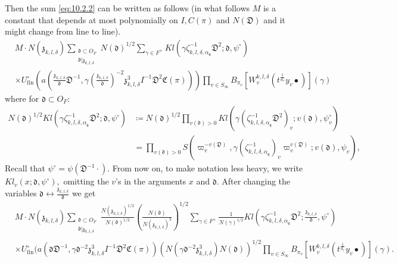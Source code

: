\documentclass[a4paper,11pt]{amsart}
\theoremstyle{definition}
\newcommand{\fin}{\text{fin}}
\begin{document}
   Then the sum \eqref{eq:10.2.2} can be written as follows (in what follows $M$ is a constant that depends at most polynomially on $I,C(\pi)$ and $N(\mathfrak{D})$ and it might change from line to line). 
    \begin{align*}
        &M\cdot N(\mathfrak{z}_{k,l,\delta})\sum_{\substack{\mathfrak{d}\subset O_F\\\mathfrak{d}|\mathfrak{z}_{k,l,\delta}}}N(\mathfrak{d})^{1/2}\sum_{\gamma \in F^{\times}}Kl(\gamma\zeta_{k,l,\delta,\alpha_{\mathfrak{q}}}^{-1}\mathfrak{D}^2;\mathfrak{d},\psi^{\circ})\\
    &\times U_{\fin}^{\circ}\left(a\left(\frac{\mathfrak{z}_{k,l,\delta}}{\mathfrak{d}}\mathfrak{D}^{-1},\gamma (\frac{\mathfrak{z}_{k,l,\delta}}{\mathfrak{d}})^{-2}\mathfrak{z}_{k,l,\delta}^3I^{-1}\mathfrak{D}^2\mathfrak{C}(\pi)\right)\right)\prod_{v\in S_{\infty}}B_{\pi_v}[W_v^{k,l,\delta}(t^{\frac{1}{d_v}}y_v\bullet)](\gamma)
\end{align*}
where for $\mathfrak{d}\subset O_F$: \begin{align*}N(\mathfrak{d})^{1/2}Kl(\gamma\zeta_{k,l,\delta,\alpha_{\mathfrak{q}}}^{-1}\mathfrak{D}^2;\mathfrak{d},\psi^{\circ}) &\coloneqq N(\mathfrak{d})^{1/2}\prod_{v(\mathfrak{d})>0}Kl(\gamma(\zeta_{k,l,\delta,\alpha_{\mathfrak{q}}}^{-1}\mathfrak{D}^2)_v;{v(\mathfrak{d})},\psi^{\circ}_v)  \\&= \prod_{v(\mathfrak{d})>0}S(\varpi_v^{-v(\mathfrak{D})},\gamma(\zeta_{k,l,\delta,\alpha_{\mathfrak{q}}}^{-1})_v\varpi_v^{v(\mathfrak{D})};{v(\mathfrak{d})},\psi_v),
\end{align*}
Recall that $\psi^{\circ} = \psi(\mathfrak{D}^{-1}\cdot)$.
From now on, to make notation less heavy, we write $Kl_v(x;{\mathfrak{d}},\psi^{\circ}),$ omitting the $v$'s in the arguments $x$ and $\mathfrak{d}$. 
After changing the variables $\mathfrak{d}\leftrightarrow\frac{\mathfrak{z}_{k,l,\delta}}{\mathfrak{d}}$ we get 
\begin{align*}
        &M\cdot N(\mathfrak{z}_{k,l,\delta})\sum_{\substack{\mathfrak{d}\subset O_F\\\mathfrak{d}|\mathfrak{z}_{k,l,\delta}}}\frac{N(\mathfrak{z}_{k,l,\delta})^{1/2}}{N(\mathfrak{d})^{1/2}}\left(\frac{N(\mathfrak{d})}{N(\mathfrak{z}_{k,l,\delta})^3}\right)^{1/2}\sum_{\gamma \in F^{\times}}\frac{1}{N(\gamma)^{1/2}}Kl(\gamma\zeta_{k,l,\delta,\alpha_{\mathfrak{q}}}^{-1}\mathfrak{D}^2;\frac{\mathfrak{z}_{k,l,\delta}}{\mathfrak{d}},\psi^{\circ})\nonumber\\
    &\times U_{\fin}^{\circ}(a(\mathfrak{d}\mathfrak{D}^{-1},\gamma \mathfrak{d}^{-2}\mathfrak{z}_{k,l,\delta}^3I^{-1}\mathfrak{D}^2\mathfrak{C}(\pi))\left(N(\gamma\mathfrak{d}^{-2}\mathfrak{z}_{k,l,\delta}^3)N(\mathfrak{d})\right)^{1/2}\prod_{v\in S_{\infty}}B_{\pi_v}[W_v^{k,l,\delta}(t^{\frac{1}{d_v}}y_v\bullet)]\left(\gamma\right).
\end{align*}
\end{document}
